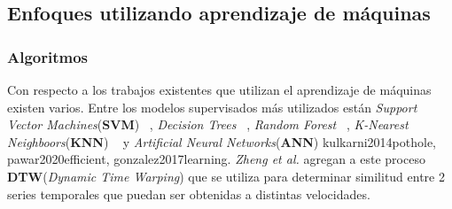 	\subsection{Enfoques utilizando aprendizaje de máquinas}
		\subsubsection{Algoritmos}
			Con respecto a los trabajos existentes que utilizan el aprendizaje de máquinas existen varios. Entre los modelos supervisados
			más utilizados están \emph{Support Vector Machines}(\textbf{SVM}) ~, \emph{Decision Trees} ~, \emph{Random Forest} ~, \emph{K-Nearest Neighboors}(\textbf{KNN})
			~ y \emph{Artificial Neural Networks}(\textbf{ANN}) \brackcite
			{kulkarni2014pothole, pawar2020efficient, gonzalez2017learning}. \emph{Zheng et al.}  agregan a este proceso
			\textbf{DTW}(\emph{Dynamic Time Warping}) que se utiliza para determinar similitud entre 2 series temporales que puedan ser obtenidas
			a distintas velocidades. 

